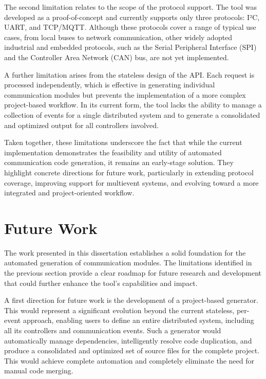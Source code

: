 The second limitation relates to the scope of the protocol support. The tool was developed as a proof-of-concept and currently supports only three protocols: I²C, UART, and TCP/MQTT. Although these protocols cover a range of typical use cases, from local buses to network communication, other widely adopted industrial and embedded protocols, such as the Serial Peripheral Interface (SPI) and the Controller Area Network (CAN) bus, are not yet implemented.

A further limitation arises from the stateless design of the API. Each request is processed independently, which is effective in generating individual communication modules but prevents the implementation of a more complex project-based workflow. In its current form, the tool lacks the ability to manage a collection of events for a single distributed system and to generate a consolidated and optimized output for all controllers involved.

Taken together, these limitations underscore the fact that while the current implementation demonstrates the feasibility and utility of automated communication code generation, it remains an early-stage solution. They highlight concrete directions for future work, particularly in extending protocol coverage, improving support for multievent systems, and evolving toward a more integrated and project-oriented workflow.



\section{Future Work}
\label{sec:future_work}

The work presented in this dissertation establishes a solid foundation for the automated generation of communication modules. The limitations identified in the previous section provide a clear roadmap for future research and development that could further enhance the tool's capabilities and impact. 

A first direction for future work is the development of a project-based generator. This would represent a significant evolution beyond the current stateless, per-event approach, enabling users to define an entire distributed system, including all its controllers and communication events. Such a generator would automatically manage dependencies, intelligently resolve code duplication, and produce a consolidated and optimized set of source files for the complete project. This would achieve complete automation and completely eliminate the need for manual code merging.

